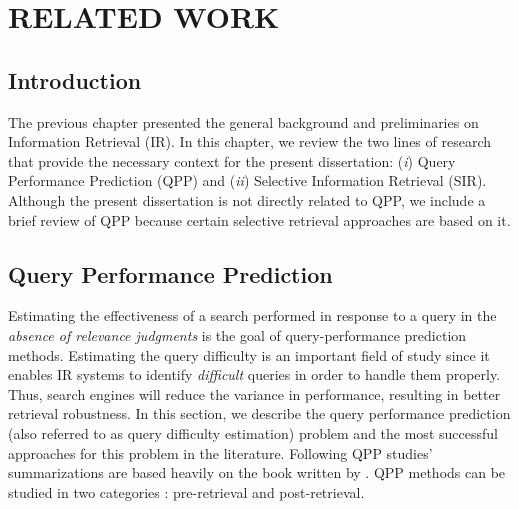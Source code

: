 %
%
%




\chapter{\textbf{RELATED WORK}}
\label{ch3}

\section{Introduction}
The previous chapter presented the general background and preliminaries on Information Retrieval (IR).
In this chapter, we review the two lines of research that provide the necessary context for the present dissertation: (\emph{i}) Query Performance Prediction (QPP) and (\emph{ii}) Selective Information Retrieval (SIR).
Although the present dissertation is not directly related to QPP, we include a brief review of QPP because certain selective retrieval approaches are based on it.

\section{Query Performance Prediction}

Estimating the effectiveness of a search performed in response to a query in the \emph{absence of relevance judgments} is the goal of query-performance prediction methods.
Estimating the query difficulty is an important field of study since it enables IR systems to identify \emph{difficult} queries in order to handle them properly. 
Thus, search engines will reduce the variance in performance, resulting in better retrieval robustness.
In this section, we describe the query performance prediction (also referred to as query difficulty estimation) problem and the most successful approaches for this problem in the literature.
Following QPP studies' summarizations are based heavily on the book written by \citet*{carmel2010estimating}. 
QPP methods can be studied in two categories : pre-retrieval and post-retrieval.

